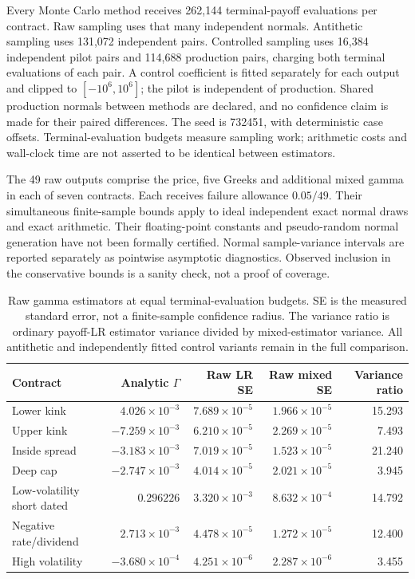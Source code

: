 \documentclass[11pt]{article}
\begin{document}
Every Monte Carlo method receives 262,144 terminal-payoff evaluations per
contract. Raw sampling uses that many independent normals. Antithetic
sampling uses 131,072 independent pairs. Controlled sampling uses 16,384
independent pilot pairs and 114,688 production pairs, charging both
terminal evaluations of each pair. A control coefficient is fitted
separately for each output and clipped to $[-10^6,10^6]$; the pilot is
independent of production. Shared production normals between methods are
declared, and no confidence claim is made for their paired differences.
The seed is 732451, with deterministic case offsets.
Terminal-evaluation budgets measure sampling work; arithmetic costs and
wall-clock time are not asserted to be identical between estimators.

The 49 raw outputs comprise the price, five Greeks and additional mixed
gamma in each of seven contracts. Each receives failure allowance
$0.05/49$. Their simultaneous finite-sample bounds apply to ideal
independent exact normal draws and exact arithmetic. Their floating-point
constants and pseudo-random normal generation have not been formally
certified. Normal sample-variance intervals are reported separately as
pointwise asymptotic diagnostics. Observed inclusion in the conservative
bounds is a sanity check, not a proof of coverage.

\begin{table}[tb]\centering\small
\begin{tabular}{lrrrr}\toprule
Contract & Analytic $\Gamma$ & Raw LR SE & Raw mixed SE & Variance ratio\\\midrule
Lower kink & $4.026\!\times\!10^{-3}$ & $7.689\!\times\!10^{-5}$ & $1.966\!\times\!10^{-5}$ & 15.293 \\
Upper kink & $-7.259\!\times\!10^{-3}$ & $6.210\!\times\!10^{-5}$ & $2.269\!\times\!10^{-5}$ & 7.493 \\
Inside spread & $-3.183\!\times\!10^{-3}$ & $7.019\!\times\!10^{-5}$ & $1.523\!\times\!10^{-5}$ & 21.240 \\
Deep cap & $-2.747\!\times\!10^{-3}$ & $4.014\!\times\!10^{-5}$ & $2.021\!\times\!10^{-5}$ & 3.945 \\
Low-volatility short dated & $0.296226$ & $3.320\!\times\!10^{-3}$ & $8.632\!\times\!10^{-4}$ & 14.792 \\
Negative rate/dividend & $2.713\!\times\!10^{-3}$ & $4.478\!\times\!10^{-5}$ & $1.272\!\times\!10^{-5}$ & 12.400 \\
High volatility & $-3.680\!\times\!10^{-4}$ & $4.251\!\times\!10^{-6}$ & $2.287\!\times\!10^{-6}$ & 3.455 \\
\bottomrule\end{tabular}
\caption{Raw gamma estimators at equal terminal-evaluation budgets. SE is the measured standard error, not a finite-sample confidence radius. The variance ratio is ordinary payoff-LR estimator variance divided by mixed-estimator variance. All antithetic and independently fitted control variants remain in the full comparison.}
\label{tab:cgbm-gamma-mc}\end{table}
\end{document}
